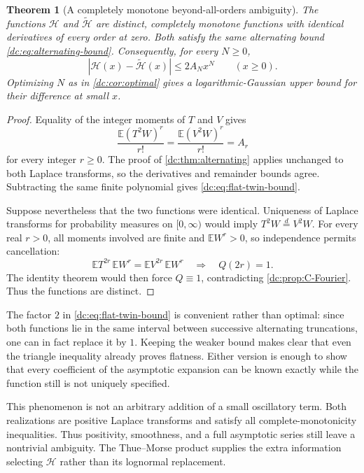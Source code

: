 \documentclass[11pt,a4paper,oneside,openany]{book}
\numberwithin{equation}{chapter}
\newtheorem{theorem}{Theorem}[chapter]
\theoremstyle{definition}
\theoremstyle{remark}
\newcommand{\E}{\mathbb E}
\newcommand{\abs}[1]{\left\lvert #1\right\rvert}
\newcommand{\calH}{\mathcal H}
\begin{document}
\begin{theorem}[A completely monotone beyond-all-orders ambiguity]
\label{dc:thm:flat-twins}
The functions $\calH$ and $\widetilde{\calH}$ are distinct, completely
monotone functions with identical derivatives of every order at
zero. Both satisfy the same alternating bound
\cref{dc:eq:alternating-bound}. Consequently, for every $N\ge0$,
\begin{equation}
 \abs{\calH(x)-\widetilde{\calH}(x)}\le2A_Nx^N
 \qquad(x\ge0).
 \label{dc:eq:flat-twin-bound}
\end{equation}
Optimizing $N$ as in \cref{dc:cor:optimal} gives a logarithmic-Gaussian
upper bound for their difference at small $x$.
\end{theorem}
\begin{proof}
Equality of the integer moments of $T$ and $V$ gives
\[
 \frac{\E(T^2W)^r}{r!}
 =\frac{\E(V^2W)^r}{r!}=A_r
\]
for every integer $r\ge0$. The proof of
\cref{dc:thm:alternating} applies unchanged to both Laplace transforms,
so the derivatives and remainder bounds agree. Subtracting the
same finite polynomial gives \cref{dc:eq:flat-twin-bound}.

Suppose nevertheless that the two functions were identical.
Uniqueness of Laplace transforms for probability measures on
$[0,\infty)$ would imply $T^2W\overset d=V^2W$.
For every real $r>0$, all moments involved are finite and
$\E W^r>0$, so independence permits cancellation:
\[
 \E T^{2r}\,\E W^r=\E V^{2r}\,\E W^r
 \quad\Longrightarrow\quad Q(2r)=1.
\]
The identity theorem would then force $Q\equiv1$, contradicting
\cref{dc:prop:C-Fourier}. Thus the functions are distinct.
\end{proof}

The factor $2$ in \cref{dc:eq:flat-twin-bound} is convenient rather than
optimal: since both functions lie in the same interval between
successive alternating truncations, one can in fact replace it by
$1$. Keeping the weaker bound makes clear that even the triangle
inequality already proves flatness. Either version is enough to
show that every coefficient of the asymptotic expansion can be
known exactly while the function still is not uniquely specified.

This phenomenon is not an arbitrary addition of a small oscillatory
term. Both realizations are positive Laplace transforms and satisfy
all complete-monotonicity inequalities. Thus positivity, smoothness,
and a full asymptotic series still leave a nontrivial ambiguity.
The Thue--Morse product supplies the extra information selecting
$\calH$ rather than its lognormal replacement.
\end{document}
